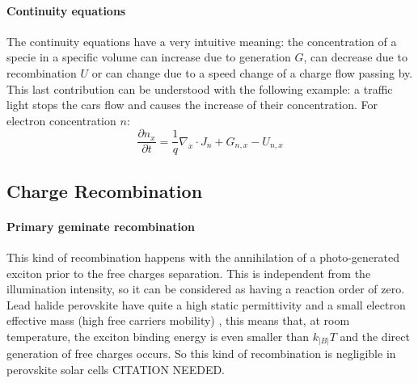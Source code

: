 		\paragraph{Continuity equations} The continuity equations have a very intuitive meaning: the concentration of a specie in a specific volume can increase due to generation $G$, can decrease due to recombination $U$ or can change due to a speed change of a charge flow passing by.
		This last contribution can be understood with the following example: a traffic light stops the cars flow and causes the increase of their concentration.
		For electron concentration $n$:
		\begin{equation}
		\frac{\partial n_x}{\partial t} = \frac{1}{q}\nabla_x \cdot J_n + G_{n,x} - U_{n,x}
		\end{equation}
		
		
		
	\subsection{Charge Recombination}

		\paragraph{Primary geminate recombination} \label{intro_geminate} This kind of recombination happens with the annihilation of a photo-generated exciton prior to the free charges separation.
		This is independent from the illumination intensity, so it can be considered as having a reaction order of zero.
		Lead halide perovskite have quite a high static permittivity \cite{Moia2019} and a small electron effective mass (high free carriers mobility) \cite{Herz2017}, this means that, at room temperature, the exciton binding energy is even smaller than $k_|B|T$ \cite{Miyata2015,Galkowski2016,Tvingstedt2015} and the direct generation of free charges occurs.
		So this kind of recombination is negligible in perovskite solar cells CITATION NEEDED.

